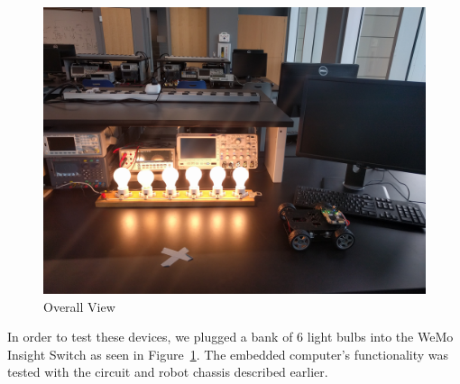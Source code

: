 \begin{figure}[H]
    \centering
    \includegraphics[scale=0.1]{figs/overallView.jpg}
    \caption{Overall View}
    \label{fig:overallView}
\end{figure}

In order to test these devices, we plugged a bank of 6 light bulbs into the WeMo
Insight Switch as seen in Figure~\ref{fig:overallView}. The embedded computer's
functionality was tested with the circuit and robot chassis described earlier.

